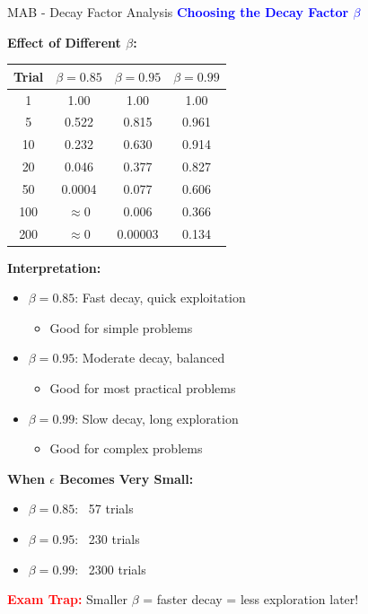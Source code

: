\documentclass[8pt]{beamer}
\begin{document}
\begin{frame}{MAB - Decay Factor Analysis}
\fontsize{6.5}{7.5}\selectfont
\textcolor{blue}{\textbf{Choosing the Decay Factor $\beta$}}

\textbf{Effect of Different $\beta$:}

\begin{tabular}{|c|c|c|c|}
\hline
Trial & $\beta=0.85$ & $\beta=0.95$ & $\beta=0.99$ \\
\hline
1 & 1.00 & 1.00 & 1.00 \\
\hline
5 & 0.522 & 0.815 & 0.961 \\
\hline
10 & 0.232 & 0.630 & 0.914 \\
\hline
20 & 0.046 & 0.377 & 0.827 \\
\hline
50 & 0.0004 & 0.077 & 0.606 \\
\hline
100 & $\approx$0 & 0.006 & 0.366 \\
\hline
200 & $\approx$0 & 0.00003 & 0.134 \\
\hline
\end{tabular}

\textbf{Interpretation:}
\begin{itemize}
\item $\beta = 0.85$: Fast decay, quick exploitation
\begin{itemize}
\item Good for simple problems
\end{itemize}
\item $\beta = 0.95$: Moderate decay, balanced
\begin{itemize}
\item Good for most practical problems
\end{itemize}
\item $\beta = 0.99$: Slow decay, long exploration
\begin{itemize}
\item Good for complex problems
\end{itemize}
\end{itemize}

\textbf{When $\epsilon$ Becomes Very Small:}
\begin{itemize}
\item $\beta=0.85$: ~57 trials
\item $\beta=0.95$: ~230 trials
\item $\beta=0.99$: ~2300 trials
\end{itemize}

\textcolor{red}{\textbf{Exam Trap:}} Smaller $\beta$ = faster decay = less exploration later!
\end{frame}
\end{document}
